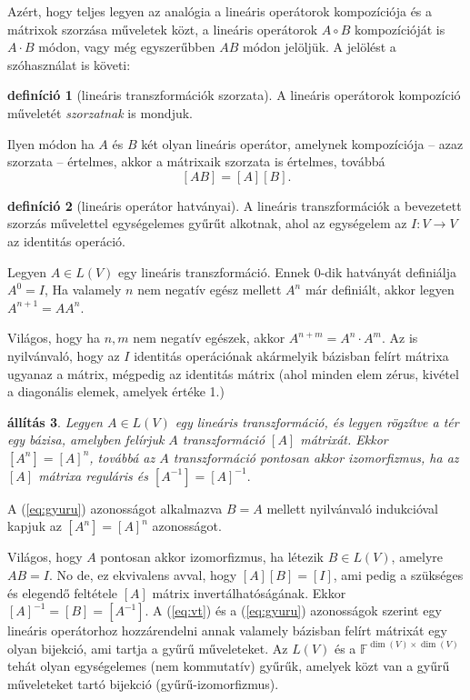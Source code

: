 \documentclass[9pt, a4paper, showtrims]{memoir}
\makeatletter
\renewenvironment{proof}[1][\proofname]
    {\par\pushQED{\qed}%
    \normalfont \topsep6\p@\@plus6\p@\relax
    \trivlist
    \item[\hskip\labelsep
        \itshape
    #1\@addpunct{:}]\ignorespaces}
    {\popQED\endtrivlist\@endpefalse}
\theoremstyle{plain}
\newtheorem{proposition}{állítás}[chapter]
\theoremstyle{remark}
\theoremstyle{definition}
\newtheorem{definition}[proposition]{definíció}
\makeatother
\begin{document}
Azért, hogy teljes legyen az analógia a lineáris operátorok kompozíciója és a mátrixok szorzása műveletek közt,
a lineáris operátorok $A\circ B$ kompozícióját is $A\cdot B$ módon, vagy még egyszerűbben $AB$ módon jelöljük.
A jelölést a szóhasználat is követi:
\begin{definition}[lineáris transzformációk szorzata]
	A lineáris operátorok kompozíció műveletét \emph{szorzatnak} is mondjuk.
\end{definition}
\noindent Ilyen módon ha $A$ és $B$ két olyan lineáris operátor, amelynek kompozíciója -- azaz szorzata -- értelmes,
akkor a mátrixaik szorzata is értelmes, továbbá
\begin{equation}\label{eq:gyuru}
	[AB]=[A][B].
\end{equation}
\begin{definition}[lineáris operátor hatványai]
	A lineáris transzformációk a bevezetett szorzás művelettel egységelemes gyűrűt alkotnak,
	ahol az egységelem az
	$I:V\to V$ az identitás operáció.

	Legyen $A\in L\left( V \right)$ egy lineáris transzformáció.
	Ennek $0$-dik hatványát definiálja $A^0=I$,
	Ha valamely $n$ nem negatív egész mellett $A^n$ már definiált,
	akkor legyen $A^{n+1}=AA^n$.
\end{definition}
Világos, hogy ha $n,m$ nem negatív egészek, akkor $A^{n+m}=A^n\cdot A^m$.
Az is nyilvánvaló, hogy az $I$ identitás operációnak akármelyik bázisban felírt mátrixa ugyanaz a mátrix,
mégpedig az identitás mátrix (ahol minden elem zérus, kivétel a diagonális elemek, amelyek értéke 1.)
\begin{proposition}
	Legyen $A\in L\left( V \right)$ egy lineáris transzformáció, és legyen rögzítve a tér egy bázisa,
	amelyben felírjuk $A$ transzformáció $[A]$ mátrixát.
	Ekkor
	\(
	\left[ A^n \right]=\left[ A \right]^n
	\),
	továbbá az $A$ transzformáció pontosan akkor izomorfizmus, 
    ha az $[A]$ mátrixa reguláris és
	\begin{math}
		\left[ A^{-1} \right]
		=
		\left[ A \right]^{-1}.
	\end{math}
\end{proposition}
\begin{proof}
	A (\ref{eq:gyuru}) azonosságot alkalmazva $B=A$ mellett nyilvánvaló indukcióval kapjuk az
	$\left[ A^n \right]=\left[ A \right]^n$
	azonosságot.

	Világos, hogy $A$ pontosan akkor izomorfizmus,
	ha létezik $B\in L\left( V \right)$, amelyre $AB=I$.
	No de, ez ekvivalens avval, hogy $[A][B]=[I]$, ami pedig a szükséges és elegendő feltétele
	$[A]$ mátrix invertálhatóságának.
	Ekkor $[A]^{-1}=[B]=\left[ A^{-1} \right]$.
\end{proof}
A (\ref{eq:vt}) és a (\ref{eq:gyuru}) azonosságok szerint 
egy lineáris operátorhoz hozzárendelni annak valamely bázisban
felírt mátrixát egy olyan bijekció, ami tartja a gyűrű műveleteket.
Az $L\left( V \right)$ és a $\mathbb{F}^{\dim(V)\times \dim(V)}$ tehát olyan egységelemes (nem kommutatív) gyűrűk,
amelyek közt van a gyűrű műveleteket tartó bijekció (gyűrű-izomorfizmus).
\end{document}
